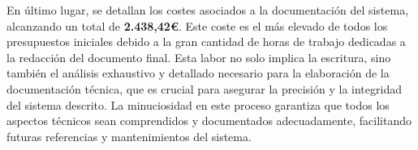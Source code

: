 En último lugar, se detallan los costes asociados a la documentación del sistema, alcanzando un total de \textbf{2.438,42€}. 
Este coste es el más elevado de todos los presupuestos iniciales debido a la gran cantidad de horas de trabajo dedicadas a la redacción del documento final. 
Esta labor no solo implica la escritura, sino también el análisis exhaustivo y detallado necesario para la elaboración de la documentación técnica, 
que es crucial para asegurar la precisión y la integridad del sistema descrito. La minuciosidad en este proceso garantiza que todos los aspectos 
técnicos sean comprendidos y documentados adecuadamente, facilitando futuras referencias y mantenimientos del sistema.

